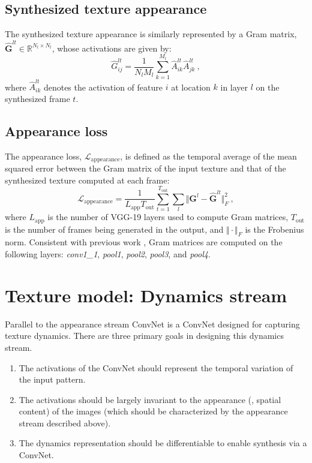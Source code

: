 \subsection{Synthesized texture appearance}

The synthesized texture appearance is similarly represented by a
Gram matrix, $\hat{\mathbf{G}}^{lt} \in \mathbb{R}^{N_l \times N_l}$,
whose activations are given by:
\begin{equation}
	\hat{G}_{ij}^{lt} = \frac{1}{N_l M_l} \sum_{k=1}^{M_l} \hat{A}_{ik}^{lt} \hat{A}_{jk}^{lt}\ ,
	\label{eq:gram_synthesized}	
\end{equation}
where $\hat{A}_{ik}^{lt}$ denotes the activation of feature $i$ at
location $k$ in layer $l$ on the synthesized frame $t$.

\subsection{Appearance loss}

The appearance loss, $\mathcal{L}_\text{appearance}$, is defined as the temporal average of the mean squared error between
the Gram matrix of the input texture and that of the synthesized
texture computed at each frame:
\begin{equation}
   \mathcal{L}_\text{appearance} = \frac{1}{L_\text{app} T_\text{out}} \sum_{t=1}^{T_\text{out}} \sum_{l} \Vert \mathbf{G}^l - \hat{\mathbf{G}}^{lt} \Vert^2_F\ ,
   \label{eq:apploss}
\end{equation}
where $L_\text{app}$ is the number of VGG-19 layers used to compute Gram
matrices, $T_\text{out}$ is the number of frames being generated in
the output, and $\Vert \cdot \Vert_F$ is the Frobenius norm.
Consistent with previous work \cite{gatys2015}, Gram matrices are computed on the
following layers: 
\emph{conv1\_1}, \emph{pool1}, \emph{pool2}, \emph{pool3}, and \emph{pool4}.

\section{Texture model: Dynamics stream}

Parallel to the appearance stream ConvNet is a ConvNet designed for capturing texture dynamics. There are three primary goals in designing this dynamics stream.
\begin{enumerate}
	\item The activations of the ConvNet should represent the temporal variation of the input pattern.
	\item The activations should be largely invariant to the appearance (\ie, spatial content) of the images (which should be characterized by the appearance stream described above).
	\item The dynamics representation should be differentiable to enable synthesis via a ConvNet.
\end{enumerate}

